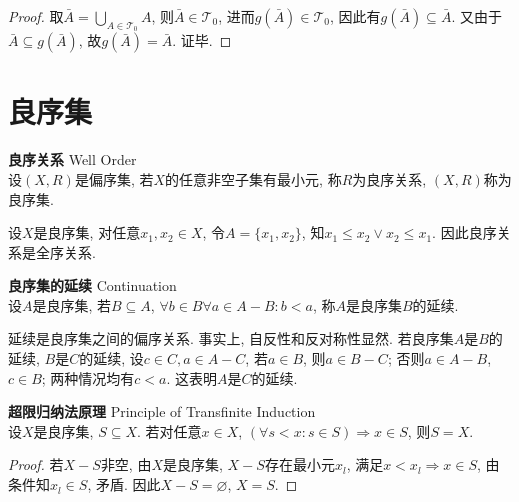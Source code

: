 \begin{proof}
\par 取$\bar{A}=\bigcup_{A\in \mathcal{T}_0} A$, 则$\bar{A}\in \mathcal{T}_0$, 进而$g(\bar{A})\in \mathcal{T}_0$, 因此有$g(\bar{A})\subseteq \bar{A}$. 又由于$\bar{A}\subseteq g(\bar{A})$, 故$g(\bar{A})=\bar{A}$. 证毕. 
\end{proof}



\section{良序集}

\begin{dfn} \textbf{良序关系} Well Order\\
设$(X,R)$是偏序集, 若$X$的任意非空子集有最小元, 称$R$为良序关系, $(X,R)$称为良序集. 
\end{dfn}
\par 设$X$是良序集, 对任意$x_1,x_2\in X$, 令$A=\{x_1,x_2\}$, 知$x_1\le x_2 \lor x_2\le x_1$. 因此良序关系是全序关系. 

\begin{dfn} \textbf{良序集的延续} Continuation\\
设$A$是良序集, 若$B\subseteq A$, $\forall b\in B\forall a\in A-B: b<a$, 称$A$是良序集$B$的延续. 
\end{dfn}
\par 延续是良序集之间的偏序关系. 事实上, 自反性和反对称性显然. 若良序集$A$是$B$的延续, $B$是$C$的延续, 设$c\in C, a\in A-C$, 若$a\in B$, 则$a\in B-C$; 否则$a\in A-B$, $c\in B$; 两种情况均有$c<a$. 这表明$A$是$C$的延续.

\begin{thm}\textbf{超限归纳法原理} Principle of Transfinite Induction\\
设$X$是良序集, $S\subseteq X$. 若对任意$x\in X$, $(\forall s<x: s\in S) \Rightarrow x\in S$, 则$S=X$. 
\label{thm:transinduct}
\end{thm}
\begin{proof}
若$X-S$非空, 由$X$是良序集, $X-S$存在最小元$x_l$, 满足$x<x_l \Rightarrow x\in S$, 由条件知$x_l \in S$, 矛盾. 因此$X-S=\varnothing$, $X=S$.
\end{proof}

